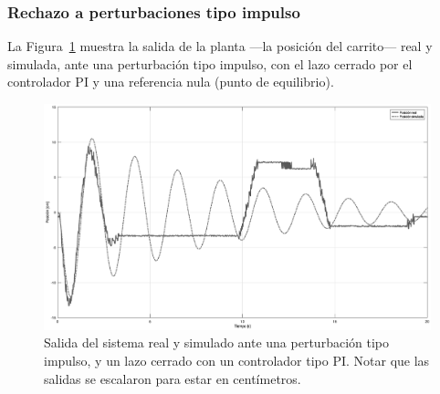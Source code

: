 \subsubsection{Rechazo a perturbaciones tipo impulso}

La Figura~\ref{fig:pi-pert-salida} muestra la salida de la planta ---la posición del carrito--- real y simulada, ante una perturbación tipo impulso, con el lazo cerrado por el controlador PI y una referencia nula (punto de equilibrio).




\begin{figure}[!htbp]
    \centering
    \includegraphics[width=\linewidth]{img/pi-pert-salida.eps}
    \caption{Salida del sistema real y simulado ante una perturbación tipo impulso, y un lazo cerrado con un controlador tipo PI. Notar que las salidas se escalaron para estar en centímetros.}
    \label{fig:pi-pert-salida}
\end{figure}


